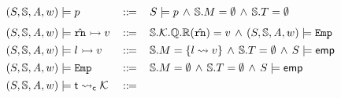 \begin{figure*}[!t]
    \centering
    \vspace{-0.5em}
    \[
        \begin{array}{lcl}
            \asrtmodel{(\state, \hpstate, \primcom, \word)}{\astP}
            & \, \define \, & 
            \asrtmodel{\state}{\astP} \, \land \, 
            \hpstate.\Mem = \emptyset \, \land \, 
            \hpstate.\thrdpool = \emptyset  \\
            \\[-5pt]
            \asrtmodel{(\state, \hpstate, \primcom, \word)}
                {\hregsto{\hrn}{\val}} & \define & 
                \hpstate.\hthrdlocalst.\hRstate.\hRfile(\hrn) 
                = \val \, \land \, 
                \asrtmodel{(\state, \hpstate, \primcom, \word)}{\empAst}
            \\
            \\[-8pt]
            \asrtmodel{(\state, \hpstate, \primcom, \word)}
                {\hmsto{\loc}{\val}} & \define & 
                \hpstate.\Mem = \{ \loc \rightsquigarrow \val \}
                \, \land \, 
                \hpstate.\thrdpool = \emptyset \, \land \, 
                \asrtmodel{\state}{\aemp} \\
            \\[-8pt]
            \asrtmodel{(\state, \hpstate, \primcom, \word)}
                {\empAst} & \define & 
                \hpstate.\Mem = \emptyset \, \land \, 
                \hpstate.\thrdpool = \emptyset \, \land \, 
                \asrtmodel{\state}{\aemp} \\
            \\[-8pt]
            \asrtmodel{(\state, \hpstate, \primcom, \word)}
                {\astCurCont{\thrdid}{\hthrdlocalst}}
                & \define & 

\end{array}\]
\end{figure*}
